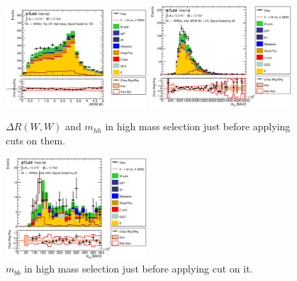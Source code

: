 \begin{figure}[!h]
\begin{center}
\includegraphics*[width=0.47\textwidth] {chapters/dihiggs/figures/ControlPlots/CR2/C_opt2000_bbpt350_drww.eps}
\includegraphics*[width=0.47\textwidth] {chapters/dihiggs/figures/ControlPlots/CR2/C_opt2000_bbpt350_wwpt360_drww20_hhMass.eps}
\caption[$\Delta R(W,W)$ and $m_{hh}$ in high mass selection just before applying cuts on them.] {$\Delta R(W,W)$ and $m_{hh}$ in high mass selection just before applying cuts on them.}
\end{center}
\end{figure}

\begin{figure}[!h]
\begin{center}
\includegraphics*[width=0.47\textwidth] {chapters/dihiggs/figures/ControlPlots/CR2/C_opt2000_bbpt350_wwpt360_drww20_hh2000above_bbMass.eps}
\caption[$m_{bb}$ in high mass selection just before applying cut on it.]{$m_{bb}$ in high mass selection just before applying cut on it.  }
\end{center}
\label{fig:mbb_high_mass}
\end{figure}

